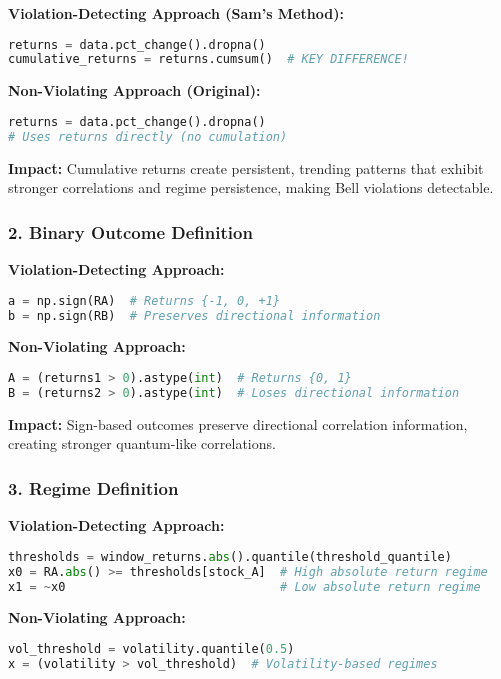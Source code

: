 \documentclass[11pt,a4paper]{article}
\begin{document}
\textbf{Violation-Detecting Approach (Sam's Method):}
\begin{lstlisting}[language=Python]
returns = data.pct_change().dropna()
cumulative_returns = returns.cumsum()  # KEY DIFFERENCE!
\end{lstlisting}

\textbf{Non-Violating Approach (Original):}
\begin{lstlisting}[language=Python]
returns = data.pct_change().dropna()
# Uses returns directly (no cumulation)
\end{lstlisting}

\textbf{Impact:} Cumulative returns create persistent, trending patterns that exhibit stronger correlations and regime persistence, making Bell violations detectable.

\subsubsection{2. Binary Outcome Definition}

\textbf{Violation-Detecting Approach:}
\begin{lstlisting}[language=Python]
a = np.sign(RA)  # Returns {-1, 0, +1}
b = np.sign(RB)  # Preserves directional information
\end{lstlisting}

\textbf{Non-Violating Approach:}
\begin{lstlisting}[language=Python]
A = (returns1 > 0).astype(int)  # Returns {0, 1}
B = (returns2 > 0).astype(int)  # Loses directional information
\end{lstlisting}

\textbf{Impact:} Sign-based outcomes preserve directional correlation information, creating stronger quantum-like correlations.

\subsubsection{3. Regime Definition}

\textbf{Violation-Detecting Approach:}
\begin{lstlisting}[language=Python]
thresholds = window_returns.abs().quantile(threshold_quantile)
x0 = RA.abs() >= thresholds[stock_A]  # High absolute return regime
x1 = ~x0                              # Low absolute return regime
\end{lstlisting}

\textbf{Non-Violating Approach:}
\begin{lstlisting}[language=Python]
vol_threshold = volatility.quantile(0.5)
x = (volatility > vol_threshold)  # Volatility-based regimes
\end{lstlisting}
\end{document}
